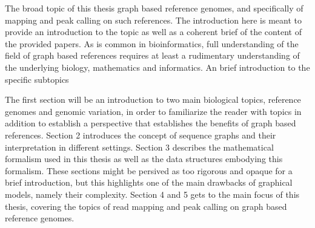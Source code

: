 The broad topic of this thesis graph based reference genomes, and specifically of mapping and peak calling on such references.
The introduction here is meant to provide an introduction to the topic as well as a coherent brief of the content of the provided papers.
As is common in bioinformatics, full understanding of the field of graph based references requires at least a rudimentary understanding of the underlying biology, mathematics and informatics. An brief introduction to the specific subtopics 

The first section will be an introduction to two main biological topics, reference genomes and genomic variation,
in order to familiarize the reader with topics in addition to establish a perspective that establishes the benefits of graph based references.
Section 2 introduces the concept of sequence graphs and their interpretation in different settings.
Section 3 describes the mathematical formalism used in this thesis as well as the data structures embodying this formalism.
These sections might be persived as too rigorous and opaque for a brief introduction, but this highlights one of the main drawbacks of graphical models, namely their complexity.
Section 4 and 5 gets to the main focus of this thesis, covering the topics of read mapping and peak calling on graph based reference genomes.



